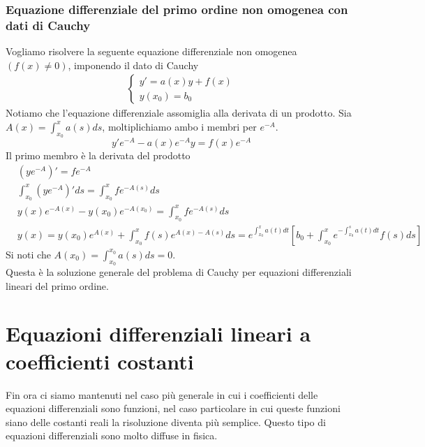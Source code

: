 \documentclass[10pt,a4paper]{article}
\begin{document}
\subsubsection{Equazione differenziale del primo ordine non omogenea con dati di Cauchy}
Vogliamo risolvere la seguente equazione differenziale non omogenea \((f(x)\neq 0)\), imponendo il dato di Cauchy
\begin{align*}
	\begin{cases}
		y'=a(x)y+f(x)\\
		y(x_0)=b_0
	\end{cases}
\end{align*}
Notiamo che l'equazione differenziale assomiglia alla derivata di un prodotto. Sia \(A(x) = \int_{x_0}^{x}a(s)ds\), moltiplichiamo ambo i membri per \(e^{-A}\). 
\[y'e^{-A}-a(x)e^{-A}y=f(x)e^{-A}\]
Il primo membro è la derivata del prodotto 
\begin{align*}
	&(ye^{-A})' = f e^{-A}\\
	&\int_{x_0}^{x}(ye^{-A})'ds = \int_{x_0}^{x}f e^{-A(s)}ds\\
	&y(x)e^{-A(x)}-y(x_0)e^{-A(x_0)} = \int_{x_0}^{x}f e^{-A(s)}ds\\
	&y(x) = y(x_0)e^{A(x)}+\int_{x_0}^{x} f(s) e^{A(x)-A(s)}ds= e^{\int_{x_0}^{x}a(t)dt}[b_0+\int_{x_0}^{x}e^{-\int_{x_0}^{s}a(t)dt}f(s)ds]
\end{align*}
Si noti che \(A(x_0) = \int_{x_0}^{x_0}a(s)ds = 0\).\\
Questa è la soluzione generale del problema di Cauchy per equazioni differenziali lineari del primo ordine. 

\section{Equazioni differenziali lineari a coefficienti costanti}
Fin ora ci siamo mantenuti nel caso più generale in cui i coefficienti delle equazioni differenziali sono funzioni, nel caso particolare in cui queste funzioni siano delle costanti reali la risoluzione diventa più semplice. Questo tipo di equazioni differenziali sono molto diffuse in fisica. 
\end{document}
